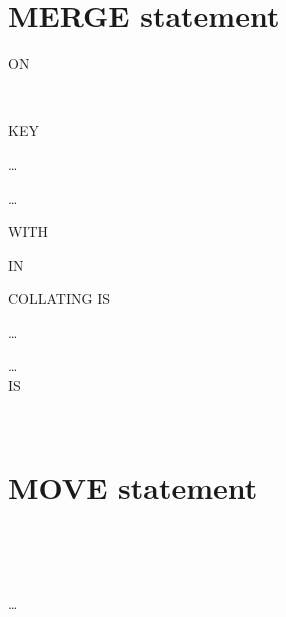 \section{MERGE statement}

 \identifier
\begin{0-1}
  ON
  \begin{1=}
     \\
  \end{1=}
  KEY
  \begin{0-1}
    \identifier
  \end{0-1}\ldots
\end{0-1} \ldots

\begin{0-1}
  WITH 
  \begin{0-1}
    IN 
  \end{0-1}
\end{0-1}

\begin{0-1}
  COLLATING  IS \identifier
\end{0-1}

\begin{0-1}
  \begin{1=}
    \filename
  \end{1=}\ldots
\end{0-1}

\begin{0-1}
  \begin{1=}
    \filename
  \end{1=}\ldots \\

    IS
  \procedurename
  \begin{0-1}
    \begin{1=}
       \\
    \end{1=}
    \procedurename
  \end{0-1}
\end{0-1}

\section{MOVE statement}

\begin{0-1}
   \\
\end{0-1}
\begin{1=}
  \identifier \\
  \literal
\end{1=}
\begin{1=}
  \identifier
\end{1=} \ldots

